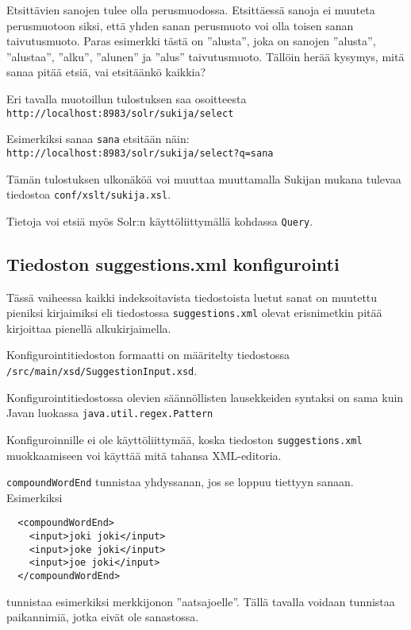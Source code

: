 \documentclass[12pt]{article}
\begin{document}
Etsittävien sanojen tulee olla perusmuodossa. Etsittäessä sanoja ei
muuteta perusmuotoon siksi, että yhden sanan perusmuoto voi olla
toisen sanan taivutusmuoto. Paras esimerkki tästä on ''alusta'', joka
on sanojen ''alusta'', ''alustaa'', ''alku'', ''alunen'' ja ''alus''
taivutusmuoto. Tällöin herää kysymys, mitä sanaa pitää etsiä, vai
etsitäänkö kaikkia?


Eri tavalla muotoillun tulostuksen saa osoitteesta
\verb=http://localhost:8983/solr/sukija/select=

Esimerkiksi sanaa \verb=sana= etsitään näin:
\verb|http://localhost:8983/solr/sukija/select?q=sana|

Tämän tulostuksen ulkonäköä voi muuttaa muuttamalla Sukijan mukana
tulevaa tiedostoa \verb=conf/xslt/sukija.xsl=.

Tietoja voi etsiä myös Solr:n käyttöliittymällä kohdassa \verb|Query|.


\subsection*{Tiedoston suggestions.xml konfigurointi}

Tässä vaiheessa kaikki indeksoitavista tiedostoista luetut sanat on
muutettu pieniksi kirjaimiksi eli tiedostossa
\verb|suggestions.xml| olevat erisnimetkin pitää kirjoittaa
pienellä alkukirjaimella.

Konfigurointitiedoston formaatti on määritelty tiedostossa
\verb=/src/main/xsd/SuggestionInput.xsd=.

Konfigurointitiedostossa olevien säännöllisten lausekkeiden syntaksi on
sama kuin Javan luokassa \verb=java.util.regex.Pattern=

Konfiguroinnille ei ole käyttöliittymää, koska tiedoston
\verb=suggestions.xml= muokkaamiseen voi käyttää mitä tahansa
XML-editoria.




\bigskip
\verb|compoundWordEnd| tunnistaa yhdyssanan, jos se loppuu tiettyyn sanaan.
Esimerkiksi

\begin{verbatim}
  <compoundWordEnd>
    <input>joki joki</input>
    <input>joke joki</input>
    <input>joe joki</input>
  </compoundWordEnd>
\end{verbatim}

tunnistaa esimerkiksi merkkijonon ''aatsajoelle''. Tällä tavalla
voidaan tunnistaa paikannimiä, jotka eivät ole sanastossa.
\end{document}
